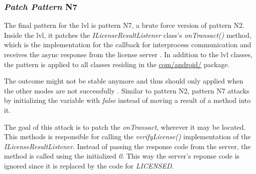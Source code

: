 \subsubsection{\textit{Patch Pattern} N7}
The final pattern for the \gls{lvl} is pattern N7, a brute force version of pattern N2.
Inside the lvl, it patches the \textit{ILicenseResultListener} class's \textit{onTransact()} method, which is the implementation for the callback for interprocess communication and receives the async response from the license server \cite{developersLicensingReference}.
In addition to the lvl classes, the pattern is applied to all classes residing in the \url{com/android/} package.

The outcome might not be stable anymore and thus should only applied when the other modes are not successfully .
\newline
Similar to pattern N2, pattern N7 attacks by initializing the variable with \textit{false} instead of moving a result of a method into it.
\newline

The goal of this attack is to patch the \textit{onTransact}, wherever it may be located.
This methods is responsible for calling the \textit{verifyLicense()} implementation of the \textit{ILicenseResultListener}.
Instead of passing the response code from the server, the method is called using the initialized \textit{0}.
This way the server's reponse code is ignored since it is replaced by the code for \textit{LICENSED}.

